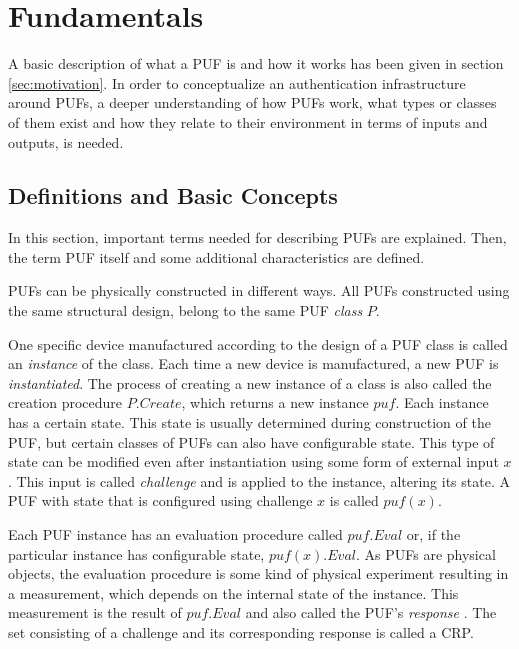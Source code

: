 \newpage
\section{Fundamentals}
\label{sec:fundamentals}

A basic description of what a \ac{PUF} is and how it works has been given in section \ref{sec:motivation}.
In order to conceptualize an authentication infrastructure around \acp{PUF},
a deeper understanding of how \acp{PUF} work, what types or classes of them exist and
how they relate to their environment in terms of inputs and outputs, is needed.

\subsection{Definitions and Basic Concepts}
\label{sec:puf_def_of_terms}

In this section, important terms needed for describing PUFs are explained.
Then, the term \acf{PUF} itself and some additional characteristics are defined.

\acp{PUF} can be physically constructed in different ways.
All PUFs constructed using the same structural design, belong
to the same PUF \emph{class} $P$. \cite[][p. 14]{Maes2013}

One specific device manufactured according to the design of a PUF class is called
an \emph{instance} of the class. Each time a new device is manufactured, a new PUF is \emph{instantiated}.
The process of creating a new instance of a class is also called the creation procedure $P.Create$, which
returns a new instance $puf$.
Each instance has a certain state. This state is usually determined during construction of the PUF, but
certain classes of PUFs can also have configurable state.
This type of state can be modified even after instantiation using some form of external input $x$.
This input is called \emph{challenge} and is applied to the instance, altering its state.
A PUF with state that is configured using challenge $x$ is called $puf(x)$. \cite[][p. 14]{Maes2013}

Each PUF instance has an evaluation procedure called $puf.Eval$ or, if the particular instance has configurable state,
$puf(x).Eval$.
As \acp{PUF} are physical objects, the evaluation procedure is some kind of physical experiment resulting in a measurement,
which depends on the internal state of the instance.
This measurement is the result of $puf.Eval$ and also called the PUF's \emph{response} \cite[][p. 14f]{Maes2013}.
The set consisting of a challenge and its corresponding response is called a \ac{CRP}.

